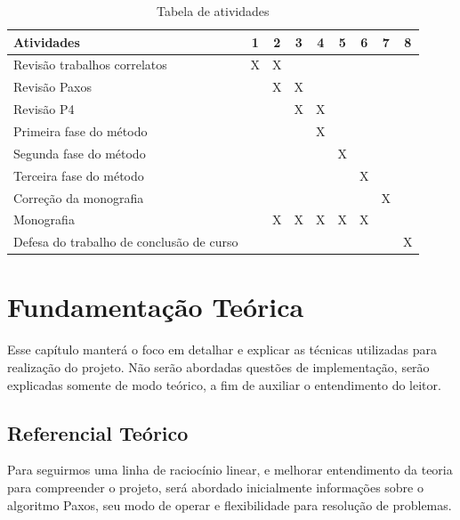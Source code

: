 \documentclass[12pt,
openright, 
oneside,
a4paper,
brazil]{facom-ufu-abntex2}
\theoremstyle{definition}
\begin{document}
\begin{table}[h!]
    \begin{tabular}{|p{8cm}|c|c|c|c|c|c|c|c|}
    \hline
    Atividades & 1 & 2 & 3 & 4 & 5 & 6 & 7 & 8 \\
    \hline
    \hline
     
    Revisão trabalhos correlatos & X & X & & & & & &  \\
    \hline 
    
    Revisão Paxos & & X & X & & & & & \\
    \hline
    
    Revisão P4 & & & X & X & & & & \\
    \hline
    
    Primeira fase do método & & & & X & & & & \\
    \hline
    
    Segunda fase do método & & & & & X & & & \\
    \hline
    
    Terceira fase do método & & & & & & X & & \\
    \hline
    
    Correção da monografia & & & & & & & X & \\
    \hline
    
    Monografia & & X & X & X & X & X & & \\
    \hline
    
    Defesa do trabalho de conclusão de curso & & & & & & & & X \\
    \hline
\end{tabular}
    \caption{Tabela de atividades}
    \label{tab:atividades}
\end{table}

\chapter{Fundamentação Teórica}
Esse capítulo manterá o foco em detalhar e explicar as técnicas utilizadas
para realização do projeto. Não serão abordadas questões de implementação,
serão explicadas somente de modo teórico, a fim de auxiliar o entendimento do leitor.

\section{Referencial Teórico}
Para seguirmos uma linha de raciocínio linear, e melhorar entendimento da teoria
para compreender o projeto, será abordado inicialmente informações sobre o 
algoritmo Paxos, seu modo de operar e flexibilidade para resolução de problemas.
\end{document}
